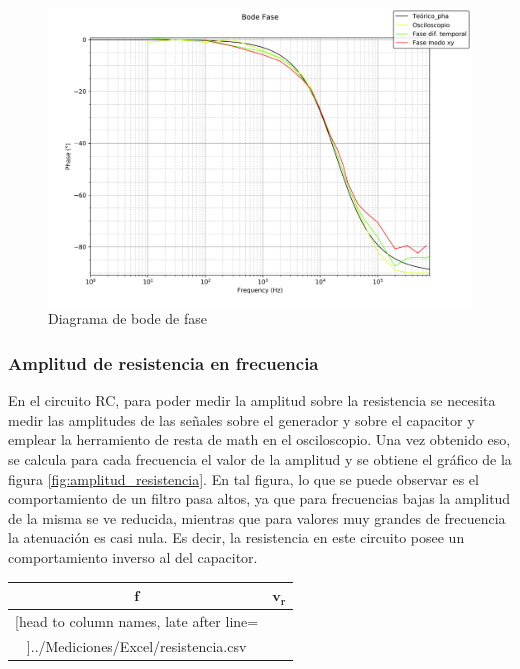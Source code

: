 \begin{figure}[H]
	\begin{center}
		\includegraphics[scale=0.6]{../Desarrollo/bode_fase.png}
	\end{center}
	\caption{Diagrama de bode de fase}
	\label{fig:bode_fase}
\end{figure}

\subsubsection*{Amplitud de resistencia en frecuencia}

En el circuito RC, para poder medir la amplitud sobre la resistencia se necesita medir las amplitudes de las se\~nales sobre el generador y sobre el capacitor y emplear la herramiento de resta de math en el osciloscopio. Una vez obtenido eso, se calcula para cada frecuencia el valor de la amplitud y se obtiene el gr\'afico de la figura \ref{fig:amplitud_resistencia}. En tal figura, lo que se puede observar es el comportamiento de un filtro pasa altos, ya que para frecuencias bajas la amplitud de la misma se ve reducida, mientras que para valores muy grandes de frecuencia la atenuaci\'on es casi nula. Es decir, la resistencia en este circuito posee un comportamiento inverso al del capacitor.

\begin{table}[H]
	\centering
	\begin{tabular}{c c}%
		$\bm{f}$ & $\bm{v_{r}}$ \\ \hline
		\csvreader[head to column names, late after line=\\]{../Mediciones/Excel/resistencia.csv}{}{\frec & \vr}
		\hline
	\end{tabular}
\end{table}

